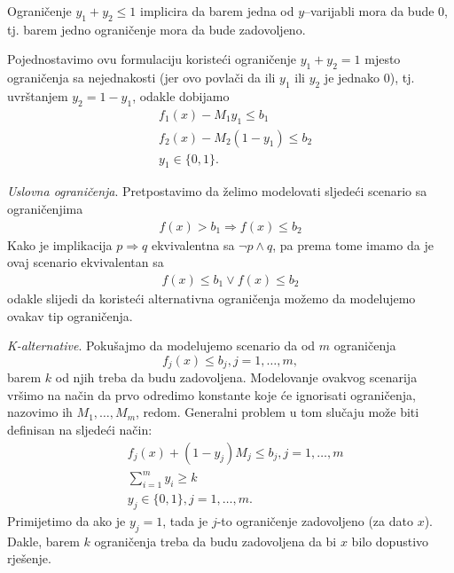 \documentclass[a4paper, utf8, 11pt, colorlinks]{book}
\begin{document}
Ograničenje $y_1 + y_2 \leq 1$ implicira da barem jedna od $y$--varijabli mora da bude 0, tj. barem jedno ograničenje mora da bude zadovoljeno. 

Pojednostavimo ovu formulaciju koristeći ograničenje $y_1 + y_2 = 1$ mjesto ograničenja sa nejednakosti (jer ovo povlači da ili $y_1$ ili $y_2$ je jednako 0), tj. uvrštanjem $y_2 =  1-y_1$, odakle dobijamo 
\begin{align*}
      & f_1(x) - M_1 y_1       \leq b_1 \\
      & f_2(x) - M_2 (1-y_1)   \leq b_2  \\
      & y_1 \in \{0,1 \}.
\end{align*}

\emph{Uslovna ograničenja}. 
Pretpostavimo da želimo modelovati sljedeći scenario sa ograničenjima 
\begin{align*}
    f(x) > b_1 \Rightarrow f(x) \leq b_2 
\end{align*}
Kako je implikacija $p \Rightarrow q$ ekvivalentna sa $\neg p \wedge q$, pa prema tome imamo da je ovaj scenario  ekvivalentan sa
\begin{align*}
    f(x) \leq b_1 \vee f(x) \leq b_2 
\end{align*}
odakle slijedi da koristeći alternativna ograničenja možemo da modelujemo ovakav tip ograničenja.

\emph{K-alternative}. Pokušajmo da modelujemo scenario da od $m$ ograničenja
$$f_j(x) \leq  b_j, j=1,\ldots,m,$$
barem $k$ od njih treba da budu zadovoljena. Modelovanje ovakvog scenarija vršimo na način da prvo odredimo konstante koje će ignorisati ograničenja, nazovimo ih $M_1, \ldots, M_m$, redom. Generalni problem u tom slučaju može biti definisan na sljedeći način:
\begin{align}
     &f_j(x) + (1-y_j) M_j \leq b_j, j=1,\ldots,m\\
     & \sum_{i=1}^m y_i \geq k \\
     & y_j \in \{0,1\}, j=1,\ldots,m.
\end{align}
Primijetimo da ako je $y_j = 1$, tada je $j$-to ograničenje zadovoljeno (za dato $x$). Dakle, barem $k$ ograničenja treba da budu zadovoljena da bi $x$ bilo dopustivo rješenje. 
\end{document}
